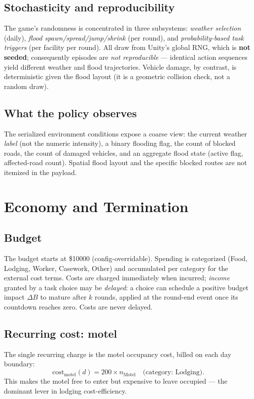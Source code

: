 \documentclass[11pt]{article}
\newcommand{\Day}{d}
\begin{document}
\subsection{Stochasticity and reproducibility}
\label{sec:flood:rng}
The game's randomness is concentrated in three subsystems: \emph{weather
selection} (daily), \emph{flood spawn/spread/jump/shrink} (per round), and
\emph{probability-based task triggers} (per facility per round). All draw from
Unity's global RNG, which is \textbf{not seeded}; consequently episodes are
\emph{not reproducible} --- identical action sequences yield different weather and
flood trajectories. Vehicle damage, by contrast, is deterministic given the flood
layout (it is a geometric collision check, not a random draw).

\subsection{What the policy observes}
The serialized environment conditions expose a coarse view: the current weather
\emph{label} (not the numeric intensity), a binary flooding flag, the count of
blocked roads, the count of damaged vehicles, and an aggregate flood state
(active flag, affected-road count). Spatial flood layout and the specific blocked
routes are not itemized in the payload.

\section{Economy and Termination}
\label{sec:economy}

\subsection{Budget}
The budget starts at \$10000 (config-overridable). Spending is categorized
(Food, Lodging, Worker, Casework, Other) and accumulated per category for the
external cost terms. Costs are charged immediately when incurred; \emph{income}
granted by a task choice may be \emph{delayed}: a choice can schedule a positive
budget impact $\Delta B$ to mature after $k$ rounds, applied at the round-end
event once its countdown reaches zero. Costs are never delayed.

\subsection{Recurring cost: motel}
The single recurring charge is the motel occupancy cost, billed on each day
boundary:
\[
  \text{cost}_{\text{motel}}(\Day) = 200 \times n_{\text{Motel}}
  \quad\text{(category: Lodging).}
\]
This makes the motel free to enter but expensive to leave occupied --- the
dominant lever in lodging cost-efficiency.
\end{document}
